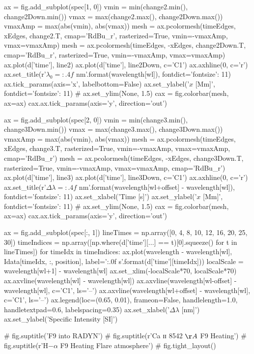 \begin{pycode}[2DRT]
    ax = fig.add_subplot(spec[1, 0])
    vmin = min(change2.min(), change2Down.min())
    vmax = max(change2.max(), change2Down.max())
    vmaxAmp = max(abs(vmin), abs(vmax))
    mesh = ax.pcolormesh(timeEdges, xEdges, change2.T, cmap='RdBu_r', rasterized=True, vmin=-vmaxAmp, vmax=vmaxAmp)
    mesh = ax.pcolormesh(timeEdges, -xEdges, change2Down.T, cmap='RdBu_r', rasterized=True, vmin=-vmaxAmp, vmax=vmaxAmp)
    ax.plot(d['time'], line2)
    ax.plot(d['time'], line2Down, c='C1')
    ax.axhline(0, c='r')
    ax.set_title(r'$\lambda_0={:.4f}$ nm'.format(wavelength[wl]), fontdict={'fontsize': 11})
    ax.tick_params(axis='x', labelbottom=False)
    ax.set_ylabel('$x$ [Mm]', fontdict={'fontsize': 11})
#     ax.set_ylim(None, 1.5)
    cax = fig.colorbar(mesh, ax=ax)
    cax.ax.tick_params(axis='y', direction='out')

    ax = fig.add_subplot(spec[2, 0])
    vmin = min(change3.min(), change3Down.min())
    vmax = max(change3.max(), change3Down.max())
    vmaxAmp = max(abs(vmin), abs(vmax))
    mesh = ax.pcolormesh(timeEdges, xEdges, change3.T, rasterized=True, vmin=-vmaxAmp, vmax=vmaxAmp, cmap='RdBu_r')
    mesh = ax.pcolormesh(timeEdges, -xEdges, change3Down.T, rasterized=True, vmin=-vmaxAmp, vmax=vmaxAmp, cmap='RdBu_r')
    ax.plot(d['time'], line3)
    ax.plot(d['time'], line3Down, c='C1')
    ax.axhline(0, c='r')
    ax.set_title(r'$\Delta\lambda={:.4f}$ nm'.format(wavelength[wl+offset] - wavelength[wl]), fontdict={'fontsize': 11})
    ax.set_xlabel('Time [s]')
    ax.set_ylabel('$x$ [Mm]', fontdict={'fontsize': 11})
#     ax.set_ylim(None, 1.5)
    cax = fig.colorbar(mesh, ax=ax)
    cax.ax.tick_params(axis='y', direction='out')

    ax = fig.add_subplot(spec[:, 1])
    lineTimes = np.array([0, 4, 8, 10, 12, 16, 20, 25, 30])
    timeIndices = np.array([np.where(d['time'][...] == t)[0].squeeze() for t in lineTimes])
    for timeIdx in timeIndices:
        ax.plot(wavelength - wavelength[wl], Idata[timeIdx, :, position], label='{:.0f} s'.format(d['time'][timeIdx]))
    localScale = wavelength[wl+1] - wavelength[wl]
    ax.set_xlim(-localScale*70, localScale*70)
    ax.axvline(wavelength[wl] - wavelength[wl])
    ax.axvline(wavelength[wl-offset] - wavelength[wl], c='C1', ls='--')
    ax.axvline(wavelength[wl+offset] - wavelength[wl], c='C1', ls='--')
    ax.legend(loc=(0.65, 0.01), frameon=False, handlelength=1.0, handletextpad=0.6, labelspacing=0.35)
    ax.set_xlabel('$\Delta\lambda$ [nm]')
    ax.set_ylabel('Specific Intensity [SI]')

#         fig.suptitle('F9 into RADYN')
#         fig.suptitle(r'Ca ɪɪ 8542 $\AA$ F9 Heating')
    # fig.suptitle(r'H$-\alpha$ F9 Heating Flare atmosphere')
    # fig.tight_layout()


\end{pycode}
